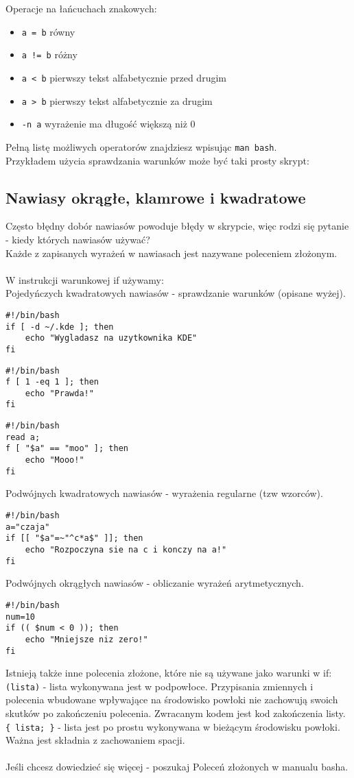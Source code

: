 Operacje na łańcuchach znakowych:
\begin{itemize}[itemsep=0cm,leftmargin=1cm]
\item \texttt{a = b} równy
\item \texttt{a != b} różny
\item \texttt{a < b} pierwszy tekst alfabetycznie przed drugim
\item \texttt{a > b} pierwszy tekst alfabetycznie za drugim
\item \texttt{-n a} wyrażenie ma długość większą niż 0
\end{itemize}
Pełną listę możliwych operatorów znajdziesz wpisując \texttt{man bash}.\\
Przykładem użycia sprawdzania warunków może być taki prosty skrypt:


\subsection{Nawiasy okrągłe, klamrowe i kwadratowe}
Często błędny dobór nawiasów powoduje błędy w skrypcie, więc rodzi się pytanie - kiedy których nawiasów używać?\\
Każde z zapisanych wyrażeń w nawiasach jest nazywane poleceniem złożonym.\\\\
W instrukcji warunkowej if używamy:\\
Pojedyńczych kwadratowych nawiasów - sprawdzanie warunków (opisane wyżej).
\begin{lstlisting}
#!/bin/bash
if [ -d ~/.kde ]; then
    echo "Wygladasz na uzytkownika KDE"
fi
\end{lstlisting}
\begin{lstlisting}
#!/bin/bash
f [ 1 -eq 1 ]; then
    echo "Prawda!" 
fi
\end{lstlisting}
\begin{lstlisting}
#!/bin/bash
read a;
f [ "$a" == "moo" ]; then
    echo "Mooo!" 
fi
\end{lstlisting}
Podwójnych kwadratowych nawiasów - wyrażenia regularne (tzw wzorców).
\begin{lstlisting}
#!/bin/bash
a="czaja"
if [[ "$a"=~"^c*a$" ]]; then
    echo "Rozpoczyna sie na c i konczy na a!"
fi
\end{lstlisting}
Podwójnych okrągłych nawiasów - obliczanie wyrażeń arytmetycznych.
\begin{lstlisting}
#!/bin/bash
num=10
if (( $num < 0 )); then
    echo "Mniejsze niz zero!"
fi 
\end{lstlisting}
Istnieją także inne polecenia złożone, które nie są używane jako warunki w if:\\
\texttt{(lista)} - lista wykonywana jest w podpowłoce. Przypisania zmiennych i  polecenia  wbudowane  wpływające na środowisko powłoki nie zachowują swoich skutków  po  zakończeniu  polecenia. Zwracanym kodem jest kod zakończenia listy.\\
\texttt{\{ lista; \}} - lista jest po prostu wykonywana w bieżącym środowisku powłoki. Ważna jest składnia z zachowaniem spacji.\\\\
Jeśli chcesz dowiedzieć się więcej - poszukaj Poleceń złożonych w manualu basha.

